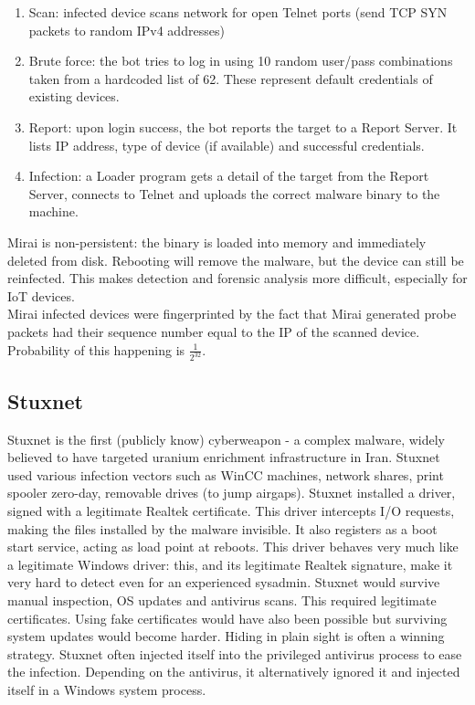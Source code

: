 \begin{enumerate}
	\item Scan: infected device scans network for open Telnet ports (send TCP SYN packets to random IPv4 addresses)
	\item Brute force: the bot tries to log in using 10 random user/pass combinations taken from
	a hardcoded list of 62. These represent default credentials of existing devices.
	\item Report: upon login success, the bot reports the target to a Report Server. It lists IP
	address, type of device (if available) and successful credentials.
	\item Infection: a Loader program gets a detail of the target from the Report Server, connects
	to Telnet and uploads the correct malware binary to the machine.
\end{enumerate}

Mirai is non-persistent: the binary is loaded into memory and immediately deleted from disk. Rebooting will remove the malware, but the device can still be reinfected. This makes detection and forensic analysis more difficult, especially for IoT devices.\\
Mirai infected devices were fingerprinted by the fact that Mirai generated probe packets had their sequence number equal to the IP of the scanned device. Probability of this happening is $\frac{1}{2^{32}}$.

\subsection{Stuxnet}

Stuxnet is the first (publicly know) cyberweapon - a complex malware, widely believed to have targeted uranium enrichment infrastructure in Iran. Stuxnet used various infection vectors such as WinCC machines, network shares, print spooler zero-day, removable drives (to jump airgaps). Stuxnet installed a driver, signed with a legitimate Realtek certificate. This driver intercepts I/O requests, making the files installed by the malware invisible. It also registers as a boot start service, acting as load point at reboots. This driver behaves very much like a legitimate Windows driver: this, and its legitimate Realtek signature, make it very hard to detect even for an experienced sysadmin. Stuxnet would survive manual inspection, OS updates and antivirus scans. This required legitimate certificates. Using fake certificates would have also been possible but surviving system updates would become harder. Hiding in plain sight is often a winning strategy. Stuxnet often injected itself into the privileged antivirus process to ease the infection. Depending on the antivirus, it alternatively ignored it and injected itself in a Windows system process. 
